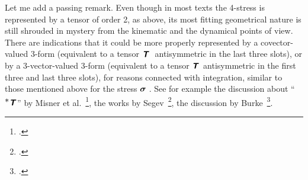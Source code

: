 \documentclass[\ifafour a4paper,12pt,\else a5paper,10pt,\fi%
onecolumn,oneside,article,%
british%
]{memoir}
\makeatletter
\newcommand*{\defquote}[1]{`\,#1\,'}
\theoremstyle{remark}
\theoremstyle{innote}
\newcommand*{\mathte}[1]{\textbf{\textit{\textsf{#1}}}}
\newcommand*{\citep}{\footcites}
\newcommand*{\amp}{\&}
\newcommand*{\de}{\partialup}%
\newcommand*{\di}{\mathrm{d}}%
\DeclareMathOperator{\tr}{tr}%
\renewcommand*{\|}[1][]{\nonscript\,#1\vert\nonscript\;\mathopen{}}
\newcommand*{\sect}{\S}%
\newcommand*{\chap}{ch.}%
\newcommand*{\etal}{{et al.}}
\newcommand*{\q}{}%
\DeclareRobustCommand*{\q}{%
  \mathbin{\mathpalette\bigcdot@{}}%
}
\newcommand*{\bigcdot@scalefactor}{0.7}
\newcommand*{\bigcdot@widthfactor}{1.5}
\newcommand*{\bigcdot@}[2]{%
  \sbox0{$#1\vcenter{}$}%
  \sbox2{$#1\cdot\m@th$}%
  \hbox to \bigcdot@widthfactor\wd2{%
    \hfil
    \raise\ht0\hbox{%
      \scalebox{\bigcdot@scalefactor}{%
        \lower\ht0\hbox{$#1\bullet\m@th$}%
      }%
    }%
    \hfil
  }%
}
\newcommand*{\yT}{\mathte{T}}
\renewcommand*{\i}{\indices}
\newcommand*{\dex}[1][i]{\frac{\de}{\de x^{#1}}}
\newcommand*{\dix}[1][i]{\di x^{#1}}
\newcommand*{\nab}{\nabla}
\newcommand*{\yt}{\bm{\sigma}}
\makeatother
\begin{document}

\medskip




Let me add a passing remark. Even though in most texts the 4-stress is
represented by a tensor of order 2, as above, its most fitting geometrical
nature is still shrouded in mystery from the kinematic and the dynamical
points of view. There are indications that it could be more properly
represented by a covector-valued 3-form (equivalent to a tensor
$\yT\i{_{\q\;\q\q\q}}$ antisymmetric in the last three slots), or by a
3-vector-valued 3-form (equivalent to a tensor $\yT\i{^{\q\q\q}_{\q\q\q}}$
antisymmetric in the first three and last three slots), for reasons
connected with integration, similar to those mentioned above for the stress
$\yt\i{_{\q\;\q\q}}$. See for example the discussion about
\enquote{$^{\displaystyle *}\mathte{T}$} by Misner
\etal~\citep[\chap~15]{misneretal1970_r1973}, the works by
Segev~\citep{segev2002,segev1986,segevetal1999,segev2000,segev2000b}, the
discussion by Burke~\citep[\sect~41]{burke1985_r1987}.





\end{document}
